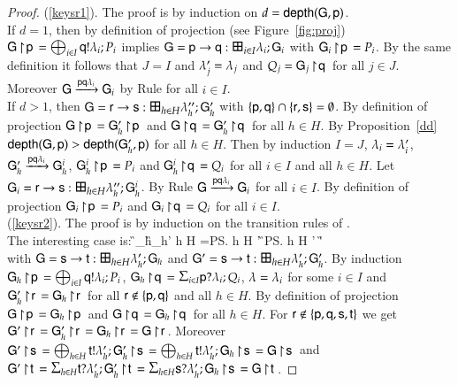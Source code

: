 \begin{proof}
  (\ref{keysr1}). The proof is by induction on $d={\sf depth}({\sf G},{\sf p})$.\\
 If $d=1$, then by definition of projection (see
  Figure~\ref{fig:proj}) ${\sf G} \! \upharpoonright \! {\sf p}\,=\bigoplus_{i\in I}{\sf q}!\lambda_i;P_i$ implies
  $\G=\gt\pp\q i I {\la} {\G}$ with ${\sf G}_i \! \upharpoonright \! {\sf p}\,=P_i$. By the
  same definition it follows that $J = I$ and $\lambda'_j=\lambda_j$ and $Q_j
  = {\sf G}_j \! \upharpoonright \! {\sf q}\,$ for all $j\in J$.  Moreover
  ${\sf G}\xrightarrow{{\sf p}{\sf q}\lambda_i}{\sf G}_i$ by Rule
   for all $i\in I$. 
  \\
  If $d>1$, then $\G=\gt\pr\ps h H {\la''} {\G'}$ with
  $\{{\sf p},{\sf q}\}\cap\{{\sf r},{\sf s}\}=\emptyset$.  By definition of
  projection ${\sf G} \! \upharpoonright \! {\sf p}\,={\sf G}'_h \! \upharpoonright \! {\sf p}\,$ and
  ${\sf G} \! \upharpoonright \! {\sf q}\,={\sf G}'_h \! \upharpoonright \! {\sf q}\,$ for all $h\in H$. By Proposition~\ref{dd}
  ${\sf depth}({\sf G},{\sf p})>{\sf depth}({\sf G}'_h,{\sf p})$ for all $h\in H$.  Then by
  induction $I=J$, $\lambda_i=\lambda_i'$,
  \mbox{${\sf G}'_h\xrightarrow{{\sf p}{\sf q}\lambda_i}{\sf G}^i_h$,} ${\sf G}^i_h \! \upharpoonright \! {\sf p}\,=P_i$
  and ${\sf G}^i_h \! \upharpoonright \! {\sf q}\,=Q_i$ for all $i\in I$ and all $h\in H$. Let
  $\G_i=\gt\pr\ps h H {\la''} {\G^i}$.  By Rule 
  ${\sf G}\xrightarrow{{\sf p}{\sf q}\lambda_i}{\sf G}_i$ for all $i\in I$.
  By definition of projection ${\sf G}_i \! \upharpoonright \! {\sf p}\,=P_i$ and ${\sf G}_i \! \upharpoonright \! {\sf q}\,=Q_i$ for all $i\in I$.\\
  (\ref{keysr2}). The proof is by induction on  the  transition rules of .  \\
  The interesting case is: \prooftree
  \G_h\stackred{\Comm\pp{\la}\q}\G_h' \quad h \in H
  \quad\set{\pp,\q}\cap\set{\ps,\pt}=\emptyset \justifies \gt\ps\pt h
  H {\la'} \G \stackred{\Comm\pp{\la}\q}\gt\ps\pt h H {\la'} {\G'}
  \using ~~~
  \endprooftree\\
  with $\G=\gt\ps\pt h H {\la'} \G$ and $\G'=\gt\ps\pt h H {\la'} {\G'} $. By induction ${\sf G}_h \! \upharpoonright \! {\sf p}\,=\bigoplus_{i\in I}{\sf q}!\lambda_i;P_i$, $\proj{\G_h}\q=\inp\pp{i}{I}{\M}{\Q}$, $\lambda=\lambda_i$ for some $i\in I$ and 
${\sf G}'_h \! \upharpoonright \! {\sf r}\,={\sf G}_h \! \upharpoonright \! {\sf r}\,$ for all ${\sf r}\not\in\{{\sf p},{\sf q}\}$ and all $h\in H$. By definition of projection ${\sf G} \! \upharpoonright \! {\sf p}\,={\sf G}_h \! \upharpoonright \! {\sf p}\,$ and ${\sf G} \! \upharpoonright \! {\sf q}\,={\sf G}_h \! \upharpoonright \! {\sf q}\,$ for all $h\in H$. For ${\sf r}\not\in\{{\sf p},{\sf q},{\sf s},{\sf t}\}$ we get $\proj{\G'}\pr=\proj{\G_h'}\pr=\proj{\G_h}\pr=\proj{\G}\pr$. Moreover $\proj{\G'}\ps=\oupp\pt{h}{H}{\M'}{\proj{\G'_h}\ps}=\oupp\pt{h}{H}{\M'}{\proj{\G_h}\ps}=\proj{\G}\ps$ and $\proj{\G'}\pt=\inpp\pt{h}{H}{\M'}{\proj{\G'_h}\pt}=\inpp\ps{h}{H}{\M'}{\proj{\G_h}\ps}=\proj{\G}\pt$.
\end{proof}
